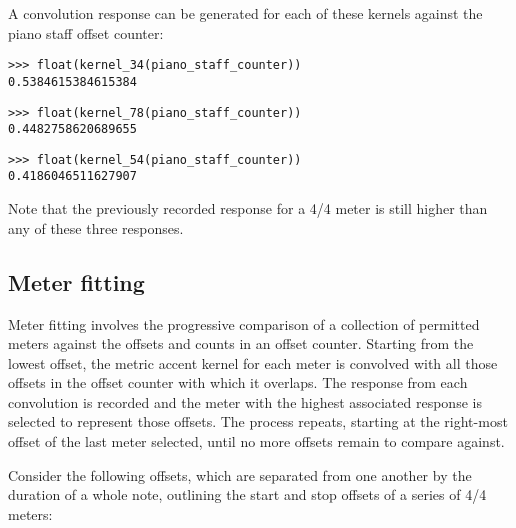 \noindent A convolution response can be generated for each of these kernels
against the piano staff offset counter:

\begin{comment}
<abjad>
float(kernel_34(piano_staff_counter))
float(kernel_78(piano_staff_counter))
float(kernel_54(piano_staff_counter))
</abjad>
\end{comment}

\begin{abjadbookoutput}
\begin{singlespacing}
\vspace{-0.5\baselineskip}
\begin{verbatim}
>>> float(kernel_34(piano_staff_counter))
0.5384615384615384
\end{verbatim}
\begin{verbatim}
>>> float(kernel_78(piano_staff_counter))
0.4482758620689655
\end{verbatim}
\begin{verbatim}
>>> float(kernel_54(piano_staff_counter))
0.4186046511627907
\end{verbatim}
\end{singlespacing}
\end{abjadbookoutput}

\noindent Note that the previously recorded response for a 4/4 meter is still
higher than any of these three responses.

\subsection{Meter fitting} %

Meter fitting involves the progressive comparison of a collection of permitted
meters against the offsets and counts in an offset counter. Starting from the
lowest offset, the metric accent kernel for each meter is convolved with all
those offsets in the offset counter with which it overlaps. The response from
each convolution is recorded and the meter with the highest associated response
is selected to represent those offsets. The process repeats, starting at the
right-most offset of the last meter selected, until no more offsets remain to
compare against.

Consider the following offsets, which are separated from one another by the
duration of a whole note, outlining the start and stop offsets of a series of
4/4 meters:

\begin{comment}
<abjad>
offset_counter = metertools.OffsetCounter([
    (0, 4), (4, 4), (8, 4), (12, 4), (16, 4),
    ])
show(offset_counter, range_=(0, 5))
</abjad>
\end{comment}


